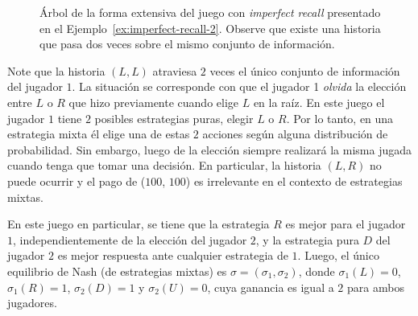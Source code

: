 \begin{figure}[h]
\begin{center}
\caption{Árbol de la forma extensiva del juego con \textit{imperfect recall} presentado en el Ejemplo~\ref{ex:imperfect-recall-2}. Observe que existe una historia que pasa dos veces sobre el mismo conjunto de información.}
\label{fig:imperfect-recall-2}
\end{center}
\end{figure}

Note que la historia $(L, L)$ atraviesa $2$ veces el único conjunto de información del jugador $1$. La situación se corresponde con que el jugador 1 \textit{olvida} la elección entre $L$ o $R$ que hizo previamente cuando elige $L$ en la raíz. En este juego el jugador $1$ tiene $2$ posibles estrategias puras, elegir $L$ o $R$. Por lo tanto, en una estrategia mixta él elige una de estas $2$ acciones según alguna distribución de probabilidad. Sin embargo, luego de la elección siempre realizará la misma jugada cuando tenga que tomar una decisión. En particular, la historia $(L,R)$ no puede ocurrir y el pago de ($100$, $100$) es irrelevante en el contexto de estrategias mixtas.

En este juego en particular, se tiene que la estrategia $R$ es mejor para el jugador $1$, independientemente de la elección del jugador $2$, y la estrategia pura $D$ del jugador $2$ es mejor respuesta ante cualquier estrategia de $1$. Luego, el único equilibrio de Nash (de estrategias mixtas) es $\sigma = (\sigma_1, \sigma_2)$, donde $\sigma_1(L) = 0$, $\sigma_1(R) = 1$, $\sigma_2(D) = 1$ y $\sigma_2(U) = 0$, cuya ganancia es igual a $2$ para ambos jugadores.

